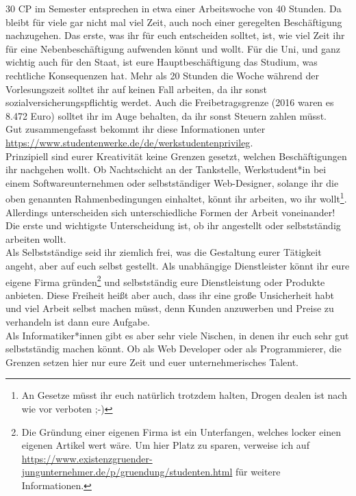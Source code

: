 {   30 CP im Semester entsprechen in etwa einer Arbeitswoche von 40 Stunden. Da
    bleibt für viele gar nicht mal viel Zeit, auch noch einer geregelten
    Beschäftigung nachzugehen. Das erste, was ihr für euch entscheiden solltet,
    ist, wie viel Zeit ihr für eine Nebenbeschäftigung aufwenden könnt und
    wollt. Für die Uni, und ganz wichtig auch für den Staat, ist eure
    Hauptbeschäftigung das Studium, was rechtliche Konsequenzen hat. Mehr als
    20 Stunden die Woche während der Vorlesungszeit solltet ihr auf keinen Fall
    arbeiten, da ihr sonst sozialversicherungspflichtig werdet. Auch die
    Freibetragsgrenze (2016 waren es 8.472 Euro) solltet ihr im Auge behalten,
    da ihr sonst Steuern zahlen müsst.\\ \vfill \columnbreak Gut zusammengefasst bekommt ihr diese
    Informationen unter \url{https://www.studentenwerke.de/de/werkstudentenprivileg}. \\

    Prinzipiell sind eurer Kreativität keine Grenzen gesetzt, welchen Beschäftigungen ihr nachgehen wollt. Ob Nachtschicht an der Tankstelle, Werkstudent*in bei einem Softwareunternehmen oder selbstständiger Web-Designer, solange ihr die oben genannten Rahmenbedingungen einhaltet, könnt ihr arbeiten, wo ihr wollt\footnote{An Gesetze müsst ihr euch natürlich trotzdem halten, Drogen dealen ist nach wie vor verboten ;-)}. Allerdings unterscheiden sich unterschiedliche Formen der Arbeit voneinander! Die erste und wichtigste Unterscheidung ist, ob ihr angestellt oder selbstständig arbeiten wollt. \\

    Als Selbstständige seid ihr ziemlich frei, was die Gestaltung eurer
    Tätigkeit angeht, aber auf euch selbst gestellt. Als unabhängige
    Dienstleister könnt ihr eure eigene Firma gründen\footnote{Die  Gründung
        einer eigenen Firma ist ein Unterfangen, welches locker einen eigenen
        Artikel wert wäre. Um hier Platz zu sparen, verweise ich auf\\
        \url{https://www.existenzgruender-jungunternehmer.de/p/gruendung/studenten.html}
        für weitere Informationen.} und selbstständig eure Dienstleistung oder
    Produkte anbieten. Diese Freiheit heißt aber auch, dass ihr eine große
    Unsicherheit habt und viel Arbeit selbst machen müsst, denn Kunden
    anzuwerben und Preise zu verhandeln ist dann eure
    Aufgabe.\\\vfill\columnbreak Als Informatiker*innen gibt es aber sehr viele Nischen, in denen ihr euch sehr gut selbstständig machen könnt. Ob als Web Developer oder als Programmierer, die Grenzen setzen hier nur eure Zeit und euer unternehmerisches Talent. \\

}
